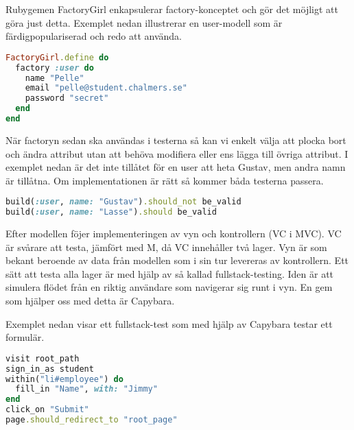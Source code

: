 Rubygemen FactoryGirl enkapsulerar factory-konceptet och gör det möjligt att göra just detta. Exemplet nedan illustrerar en user-modell som är färdigpopulariserad och redo att använda.

\begin{lstlisting}[language=Ruby]
FactoryGirl.define do
  factory :user do
    name "Pelle"
    email "pelle@student.chalmers.se"
    password "secret"
  end
end
\end{lstlisting}

När factoryn sedan ska användas i testerna så kan vi enkelt välja att plocka bort och ändra attribut utan att behöva modifiera eller ens lägga till övriga attribut. I exemplet nedan är det inte tillåtet för en user att heta Gustav, men andra namn är tillåtna. Om implementationen är rätt så kommer båda testerna passera.

\begin{lstlisting}[language=Ruby]
build(:user, name: "Gustav").should_not be_valid
build(:user, name: "Lasse").should be_valid
\end{lstlisting}

Efter modellen föjer implementeringen av vyn och kontrollern (VC i MVC). VC är svårare att testa, jämfört med M, då VC innehåller två lager. Vyn är som bekant beroende av data från modellen som i sin tur levereras av kontrollern. Ett sätt att testa alla lager är med hjälp av så kallad fullstack-testing. Iden är att simulera flödet från en riktig användare som navigerar sig runt i vyn. En gem som hjälper oss med detta är Capybara.

Exemplet nedan visar ett fullstack-test som med hjälp av Capybara testar ett formulär.

\begin{lstlisting}[language=Ruby]
visit root_path
sign_in_as student
within("li#employee") do
  fill_in "Name", with: "Jimmy"
end
click_on "Submit"
page.should_redirect_to "root_page"
\end{lstlisting}
